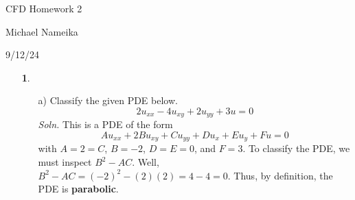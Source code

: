 \documentclass{article}
\begin{document}
\begin{center}
    {\huge CFD Homework 2}
    \vspace{0.5cm}

    {\Large Michael Nameika}
    \vspace{0.5cm}

    {\large 9/12/24}
\end{center}


\begin{itemize}
    \item[\textbf{1}.]
    \begin{itemize}
        \item[a)] Classify the given PDE below.
        \[2u_{xx} - 4u_{xy} + 2u_{yy} + 3u = 0\]
        \textit{Soln.} This is a PDE of the form 
        \[Au_{xx} + 2Bu_{xy} + Cu_{yy} + Du_x + Eu_y + Fu = 0\]
        with $A = 2 = C$, $B = -2$, $D = E = 0$, and $F = 3$. To classify the PDE, we must inspect $B^2 - AC$. Well, $B^2 - AC = (-2)^2 - (2)(2) = 4 - 4 = 0$. Thus, by definition, the PDE is \textbf{parabolic}.
        \newline\newline


\end{itemize}
\end{itemize}
\end{document}
